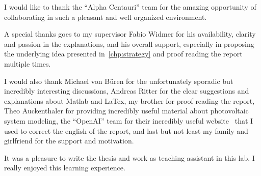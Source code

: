 
\begin{acknowledgment}
I would like to thank the \enquote{Alpha Centauri} team for the amazing opportunity of collaborating in such a pleasant and well organized environment.

A special thanks goes to my supervisor Fabio Widmer for his availability, clarity and passion in the explanations, and his overall support, especially in proposing the underlying idea presented in~\cref{chp:strategy} and proof reading the report multiple times.

I would also thank Michael von Büren for the unfortunately sporadic but incredibly interesting discussions, Andreas Ritter for the clear suggestions and explanations about Matlab and LaTex, my brother for proof reading the report, Theo Auckenthaler for providing incredibly useful material about photovoltaic system modeling, the \enquote{OpenAI} team for their incredibly useful website~\cite{chatgpt:2022webpage} that I used to correct the english of the report, and last but not least my family and girlfriend for the support and motivation.

It was a pleasure to write the thesis and work as teaching assistant in this lab. I really enjoyed this learning experience.
\end{acknowledgment}